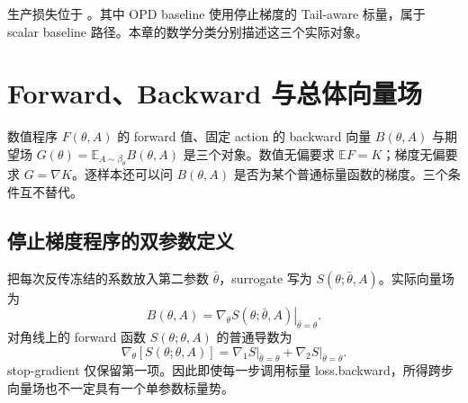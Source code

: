 \documentclass[lang=cn,scheme=chinese,openany]{../book/elegantbook}
\newcommand{\E}{\mathbb E}
\begin{document}
生产损失位于 。其中 OPD baseline 使用停止梯度的 Tail-aware 标量，属于 scalar baseline 路径。本章的数学分类分别描述这三个实际对象。



\section{Forward、Backward 与总体向量场}
\label{est:fields}

数值程序 $F(\theta,A)$ 的 forward 值、固定 action 的 backward 向量 $B(\theta,A)$ 与期望场 $G(\theta)=\E_{A\sim\beta_\theta}B(\theta,A)$ 是三个对象。数值无偏要求 $\E F=K$；梯度无偏要求 $G=\nabla K$。逐样本还可以问 $B(\theta,A)$ 是否为某个普通标量函数的梯度。三个条件互不替代。

\subsection{停止梯度程序的双参数定义}
\label{est:two-parameter}
把每次反传冻结的系数放入第二参数 $\bar\theta$，surrogate 写为 $S(\theta;\bar\theta,A)$。实际向量场为
\begin{equation}
B(\theta,A)=\left.\nabla_\theta S(\theta;\bar\theta,A)\right|_{\bar\theta=\theta}.
\end{equation}
对角线上的 forward 函数 $S(\theta;\theta,A)$ 的普通导数为
\begin{equation}
\nabla_\theta[S(\theta;\theta,A)]
=\left.\nabla_1S\right|_{\bar\theta=\theta}
+\left.\nabla_2S\right|_{\bar\theta=\theta}.
\end{equation}
stop-gradient 仅保留第一项。因此即使每一步调用标量 loss.backward，所得跨步向量场也不一定具有一个单参数标量势。
\end{document}
